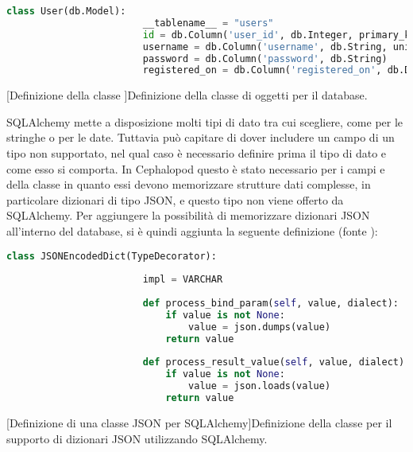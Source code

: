             \begin{center}
                \begin{lstlisting}[language=python, gobble=18]
                    class User(db.Model):
                        __tablename__ = "users"
                        id = db.Column('user_id', db.Integer, primary_key=True)
                        username = db.Column('username', db.String, unique=True, index=True)
                        password = db.Column('password', db.String)
                        registered_on = db.Column('registered_on', db.DateTime)
                \end{lstlisting}
                \captionsetup{textformat=empty,labelformat=empty} \vspace{-2em}
                [Definizione della classe ]{Definizione della classe di oggetti  per il database.}
            \end{center}
            
            SQLAlchemy mette a disposizione molti tipi di dato tra cui scegliere, come  per le stringhe o  per le date. Tuttavia può capitare di dover includere un campo di un tipo non supportato, nel qual caso è necessario definire prima il tipo di dato e come esso si comporta. In Cephalopod questo è stato necessario per i campi  e  della classe  in quanto essi devono memorizzare strutture dati complesse, in particolare dizionari di tipo \ac{JSON}, e questo tipo non viene offerto da SQLAlchemy. Per aggiungere la possibilità di memorizzare dizionari \ac{JSON} all'interno del database, si è quindi aggiunta la seguente definizione (fonte \cite{sqlalchemy:custom}):
            
            \begin{center}
                \begin{lstlisting}[language=python, gobble=18]
                    class JSONEncodedDict(TypeDecorator):
                    
                        impl = VARCHAR
                    
                        def process_bind_param(self, value, dialect):
                            if value is not None:
                                value = json.dumps(value)
                            return value
                    
                        def process_result_value(self, value, dialect):
                            if value is not None:
                                value = json.loads(value)
                            return value
                \end{lstlisting}
                \captionsetup{textformat=empty,labelformat=empty} \vspace{-2em}
                [Definizione di una classe JSON per SQLAlchemy]{Definizione della classe per il supporto di dizionari JSON utilizzando SQLAlchemy.}
            \end{center}
            
